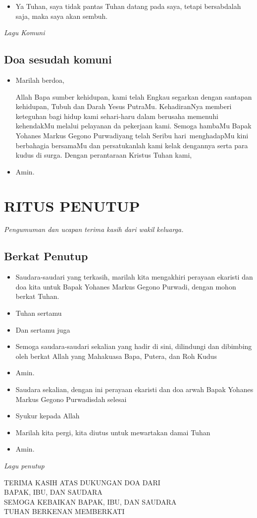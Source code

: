 \documentclass[a5paper,headsepline,titlepage,12pt,nnormalheadings,DIVcalc,twoside]{scrbook}
\makeatletter
\newcommand{\lagu}[1]{%
  {\parindent \z@ 
    \interlinepenalty\@M \slshape \mdseries \large \textit{#1}\par\nobreak \vskip 10\p@ }}
\newcommand{\keterangan}[1]{%
  {\parindent \z@ 
    \interlinepenalty\@M \slshape \mdseries \textit{#1}\par\nobreak \vskip 10\p@ }}
\newcommand{\BU}[1]{\begin{itemize} \item[U:] #1 \end{itemize}}
\newcommand{\BI}[1]{\begin{itemize} \item[I:] #1 \end{itemize}}
\newcommand{\namaalm}{Bapak Yohanes Markus Gegono Purwadi}
\newcommand{\Peringatan}{Seribu hari}
\makeatother
\begin{document}
\BU{Ya Tuhan, saya tidak pantas Tuhan datang pada saya, tetapi bersabdalah saja, maka saya akan sembuh.}

\lagu{Lagu Komuni}

\subsection*{Doa sesudah komuni}

\BI{Marilah berdoa,

Allah Bapa sumber kehidupan, kami telah Engkau segarkan dengan santapan kehidupan, Tubuh dan Darah Yesus PutraMu. KehadiranNya memberi keteguhan bagi hidup kami sehari-haru dalam berusaha memenuhi kehendakMu melalui pelayanan da  pekerjaan kami. Semoga hambaMu \namaalm yang telah \Peringatan ~menghadapMu kini berbahagia bersamaMu dan persatukanlah kami kelak dengannya serta para kudus di surga. Dengan perantaraan Kristus Tuhan kami,}

\BU{Amin.}

\section*{RITUS PENUTUP}

\keterangan{Pengumuman dan ucapan terima kasih dari wakil keluarga.}

\subsection*{Berkat Penutup}

\BI{Saudara-saudari yang terkasih, marilah kita mengakhiri perayaan ekaristi dan doa kita untuk \namaalm, dengan mohon berkat Tuhan.}

\BI{Tuhan sertamu}

\BU{Dan sertamu juga}

\BI{Semoga saudara-saudari sekalian yang hadir di sini, dilindungi dan dibimbing oleh berkat Allah yang Mahakuasa Bapa, Putera, dan Roh Kudus}

\BU{Amin.}

\BI{Saudara sekalian, dengan ini perayaan ekaristi dan doa arwah \namaalm sdah selesai}

\BU{Syukur kepada Allah}

\BI{Marilah kita pergi, kita diutus untuk mewartakan damai Tuhan}

\BU{Amin.}

\lagu{Lagu penutup}

\begin{center}
TERIMA KASIH ATAS DUKUNGAN DOA DARI\\
BAPAK, IBU, DAN SAUDARA\\
SEMOGA KEBAIKAN BAPAK, IBU, DAN SAUDARA\\
TUHAN BERKENAN MEMBERKATI
\end{center}
\end{document}
